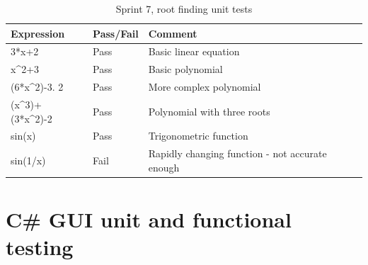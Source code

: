 \documentclass[a4paper, oneside, 11pt]{report}
\begin{document}
\begin{table}[h]
\caption{Sprint 7, root finding unit tests}
\label{sprint7-root-unit-test}
\begin{tabular}{|l|l|l|}
\hline
\textbf{Expression} & \textbf{Pass/Fail} & \textbf{Comment}                                                                     \\ \hline
3*x+2                 & Pass               & Basic linear equation                                                                \\ \hline
x\^{}2+3              & Pass               & Basic polynomial                                                                     \\ \hline
(6*x\^{}2)-3.  2      & Pass               & More complex polynomial                                                             \\ \hline
(x\^{}3)+(3*x\^{}2)-2 & Pass               & Polynomial with three roots                                                         \\ \hline
sin(x)                & Pass               & Trigonometric function                                                              \\ \hline
sin(1/x)              & Fail               & Rapidly changing function - not accurate enough                                     \\ \hline
\end{tabular}
\end{table}

\newpage
\section{C\# GUI unit  and functional testing}
\end{document}
